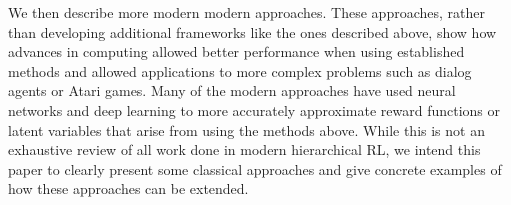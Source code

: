 We then describe more modern modern approaches. These approaches, rather than developing additional frameworks like the ones described above, show how advances in computing allowed better performance when using established methods and allowed applications to more complex problems such as dialog agents or Atari games. Many of the modern approaches have used neural networks and deep learning to more accurately approximate reward functions or latent variables that arise from using the methods above. While this is not an exhaustive review of all work done in modern hierarchical RL, we intend this paper to clearly present some classical approaches and give concrete examples of how these approaches can be extended.  

